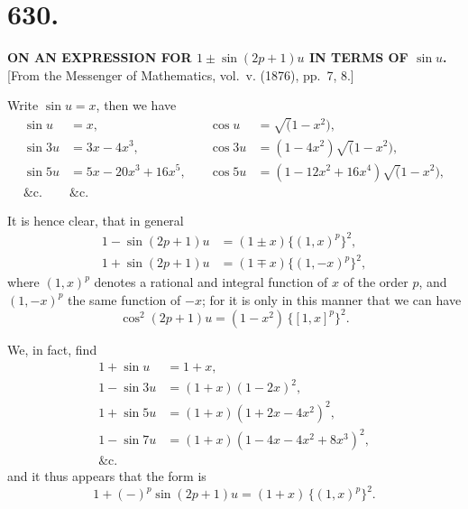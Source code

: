 \documentclass[12pt,a4paper]{article}
\theoremstyle{plain}
\theoremstyle{definition}
\theoremstyle{remark}
\begin{document}
\setcounter{page}{1}

\section*{630.}

\begin{center}
\textbf{ON AN EXPRESSION FOR $1 \pm \sin(2p+1)u$ IN TERMS OF $\sin u$.}\\[1em]
[From the Messenger of Mathematics, vol.~v. (1876), pp.~7, 8.]
\end{center}

Write $\sin u = x$, then we have
\begin{align*}
\sin u &= x, & \cos u &= \surd(1-x^2), \\
\sin 3u &= 3x - 4x^3, & \cos 3u &= (1-4x^2)\surd(1-x^2), \\
\sin 5u &= 5x - 20x^3 + 16x^5,\quad & \cos 5u &= (1-12x^2+16x^4)\surd(1-x^2), \\
\&\text{c.} & \&\text{c.}
\end{align*}

It is hence clear, that in general
\begin{align*}
1 - \sin(2p+1)u &= (1 \pm x)\{(1, x)^p\}^2, \\
1 + \sin(2p+1)u &= (1 \mp x)\{(1, -x)^p\}^2,
\end{align*}
where $(1, x)^p$ denotes a rational and integral function of $x$ of the order $p$, and $(1, -x)^p$ the same function of $-x$; for it is only in this manner that we can have
\[
\cos^2(2p+1)u = (1-x^2)\,\{[1, x]^p\}^2.
\]

We, in fact, find
\begin{align*}
1 + \sin u &= 1+x, \\
1 - \sin 3u &= (1+x)(1-2x)^2, \\
1 + \sin 5u &= (1+x)(1+2x-4x^2)^2, \\
1 - \sin 7u &= (1+x)(1-4x-4x^2+8x^3)^2, \\
\&\text{c.}
\end{align*}
and it thus appears that the form is
\[
1 + (-)^p \sin(2p+1)u = (1+x)\,\{(1, x)^p\}^2.
\]
\end{document}

